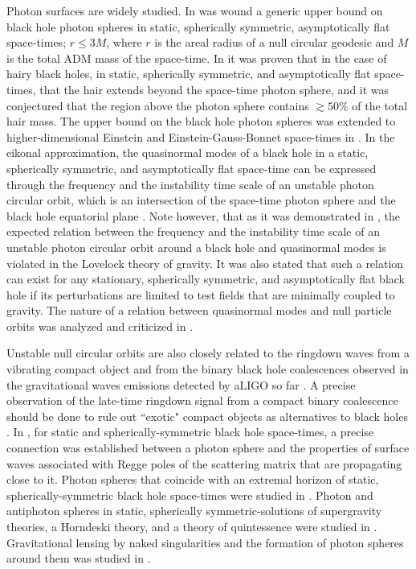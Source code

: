 \documentclass[twocolumn,showpacs,preprintnumbers,amsmath,amssymb,floatfix,nofootinbib]{revtex4-1}
\begin{document}
Photon surfaces are widely studied. In \cite{Hod:2017xkz} was wound a generic upper bound on black hole photon spheres in static, spherically symmetric, asymptotically flat space-times; $r\leq 3M$, where $r$ is the areal radius of a null circular geodesic and $M$ is the total ADM mass of the space-time. In \cite{Hod:2011aa} it was proven that in the case of hairy black holes, in static, spherically symmetric, and asymptotically flat space-times, that the hair extends beyond the space-time photon sphere, and it was conjectured that the region above the photon sphere contains $\gtrsim 50\%$ of the total hair mass. The upper bound on the black hole photon spheres was extended to higher-dimensional Einstein and Einstein-Gauss-Bonnet space-times in \cite{Gallo:2015bda}. In the eikonal approximation, the quasinormal modes of a black hole in a static, spherically symmetric, and asymptotically flat space-time can be expressed through the frequency and the instability time scale of an unstable photon circular orbit, which is an intersection of the space-time photon sphere and the black hole equatorial plane \cite{Cardoso:2008bp,Stefanov:2010xz}. Note however, that as it was demonstrated in \cite{Konoplya:2017wot}, the expected relation between the frequency and the instability time scale of an unstable photon circular orbit around a black hole and quasinormal modes is violated in the Lovelock theory of gravity. It was also stated that such a relation can exist for any stationary, spherically symmetric, and asymptotically flat black hole if its perturbations are limited to test fields that are minimally coupled to gravity. The nature of a relation between quasinormal modes and null particle orbits was analyzed and criticized in \cite{Khanna:2016yow}. 

Unstable null circular orbits are also closely related to the ringdown waves from a vibrating compact object \cite{Press:1971wr,Goebel,Ferrari:1984zz,Berti:2009kk} and from the binary black hole coalescences observed in the gravitational waves emissions detected by aLIGO so far \cite{Abbott:2016blz,Abbott:2016nmj,TheLIGOScientific:2016qqj,TheLIGOScientific:2016pea,Abbott:2017vtc}. A precise observation of the late-time ringdown signal from a compact binary coalescence should be done to rule out ``exotic" compact objects as alternatives to black holes \cite{Cardoso:2016rao}. In \cite{Decanini:2010fz}, for static and spherically-symmetric black hole space-times, a precise connection was established between a photon sphere and the properties of surface waves associated with Regge poles of the scattering matrix that are propagating close to it. Photon spheres that coincide with an extremal horizon of static, spherically-symmetric black hole space-times were studied in \cite{Khoo:2016xqv}. Photon and antiphoton spheres in static, spherically symmetric-solutions of supergravity theories, a Horndeski theory, and a theory of quintessence were studied in \cite{Cvetic:2016bxi}. Gravitational lensing by naked singularities and the formation of photon spheres around them was studied in \cite{Virbhadra:1998dy,Virbhadra:2002ju,Virbhadra:2007kw}. 
\end{document}
